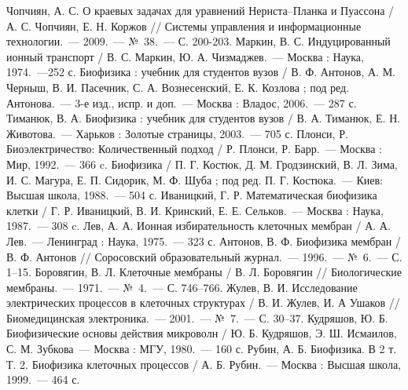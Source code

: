 \begin{thebibliography}{99}
 Чопчиян, А. С. О краевых задачах для уравнений Нернста--Планка
    и Пуассона / А. С. Чопчиян, Е. Н. Коржов // Системы управления и
    информационные технологии.~--- 2009.~--- №~38.~--- С. 200-203.
 Маркин, В. С. Индуцированный ионный транспорт / В. С. Маркин,
    Ю. А. Чизмаджев.~--- Москва : Наука, 1974.~---252 с.
 Биофизика : учебник для студентов вузов / В. Ф. Антонов, А. М.
    Черныш, В. И. Пасечник, С. А. Вознесенский, Е. К. Козлова ; под ред. Антонова.~---
    3-е изд., испр. и доп.~--- Москва : Владос, 2006.~--- 287 с.
 Тиманюк, В. А. Биофизика : учебник для студентов вузов /
    В. А. Тиманюк, Е. Н. Животова.~--- Харьков : Золотые страницы, 2003.~--- 705 с.
 Плонси, Р. Биоэлектричество: Количественный подход / Р. Плонси,
    Р. Барр.~--- Москва : Мир, 1992.~--- 366 c.
 Биофизика / П. Г. Костюк, Д. М. Гродзинский,
    В. Л. Зима, И. С. Магура, Е. П. Сидорик, М. Ф. Шуба ; под ред. П. Г. Костюка.~--- Киев: Высшая
    школа, 1988.~--- 504 с.
 Иваницкий, Г. Р. Математическая биофизика клетки / Г. Р.
    Иваницкий, В. И. Кринский, Е. Е. Сельков.~--- Москва : Наука, 1987.~---
    308 c.
 Лев, А. А. Ионная избирательность клеточных мембран /
    А. А. Лев.~--- Ленинград : Наука, 1975.~--- 323 с.
 Антонов, В. Ф. Биофизика мембран / В. Ф. Антонов // Соросовский
    образовательный журнал.~--- 1996.~--- №~6.~--- С. 1--15.
 Боровягин, В. Л. Клеточные мембраны / В. Л. Боровягин //
    Биологические мембраны.~--- 1971.~--- №~4.~--- С. 746--766.
 Жулев, В. И. Исследование электрических процессов в клеточных
    структурах / В. И. Жулев, И. А Ушаков // Биомедицинская электроника.~---
    2001.~--- №~7.~--- С. 30--37.
 Кудряшов, Ю. Б. Биофизические основы действия микроволн /
    Ю. Б. Кудряшов, Э. Ш. Исмаилов, С. М. Зубкова~--- Москва : МГУ, 1980.~---
    160 с.
 Рубин, А. Б. Биофизика. В 2 т. Т. 2. Биофизика клеточных
    процессов / А. Б. Рубин.~--- Москва : Высшая школа, 1999.~--- 464 с.
\end{thebibliography}
